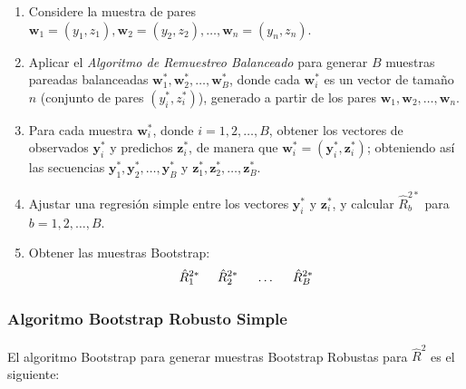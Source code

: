 \begin{enumerate}
	\item Considere la muestra de pares \( \mathbf{w}_{1} = (y_{1}, z_{1}), \mathbf{w}_{2} = (y_{2}, z_{2}), \dots, \mathbf{w}_{n} = (y_{n}, z_{n}) \).
	
	\item Aplicar el \textit{Algoritmo de Remuestreo Balanceado} para generar \( B \) muestras pareadas balanceadas \( \mathbf{w}^{*}_{1}, \mathbf{w}^{*}_{2}, \dots, \mathbf{w}^{*}_{B} \), donde cada \( \mathbf{w}^{*}_{i} \) es un vector de tamaño \( n \) (conjunto de pares \( (y_{i}^{*}, z_{i}^{*}) \)), generado a partir de los pares \( \mathbf{w}_{1}, \mathbf{w}_{2}, \dots, \mathbf{w}_{n} \).
	
	\item Para cada muestra \( \mathbf{w}^{*}_{i} \), donde \( i = 1, 2, \dots, B \), obtener los vectores de observados \( \mathbf{y}^{*}_{i} \) y predichos \( \mathbf{z}^{*}_{i} \), de manera que \( \mathbf{w}^{*}_{i} = (\mathbf{y}_{i}^{*}, \mathbf{z}_{i}^{*}) \); obteniendo así las secuencias \( \mathbf{y}_{1}^{*}, \mathbf{y}_{2}^{*}, \dots, \mathbf{y}_{B}^{*} \) y \( \mathbf{z}_{1}^{*}, \mathbf{z}_{2}^{*}, \dots, \mathbf{z}_{B}^{*} \).
	
	\item Ajustar una regresión simple entre los vectores \( \mathbf{y}^{*}_{i} \) y \( \mathbf{z}_{i}^{*} \), y calcular \( \hat{R}^{2*}_{b} \) para \( b = 1, 2, \dots, B \).
	
	\item Obtener las muestras Bootstrap:
	\[
	\hat{R}^{2*}_{1} \hspace{.5cm} \hat{R}^{2*}_{2} \hspace{.5cm} \dots \hspace{.5cm} \hat{R}^{2*}_{B}
	\]
\end{enumerate}



\subsubsection{Algoritmo Bootstrap Robusto Simple \parencite{zacarias-2023} }
El algoritmo Bootstrap para generar muestras Bootstrap Robustas para $\hat{R}^{2}$ es el siguiente:


